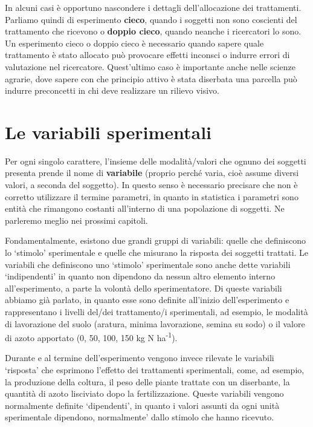 \documentclass[a4paper,12pt,oneside]{book}
\begin{document}
In alcuni casi è opportuno nascondere i dettagli dell'allocazione dei trattamenti. Parliamo quindi di esperimento \textbf{cieco}, quando i soggetti non sono coscienti del trattamento che ricevono o \textbf{doppio cieco}, quando neanche i ricercatori lo sono. Un esperimento cieco o doppio cieco è necessario quando sapere quale trattamento è stato allocato può provocare effetti inconsci o indurre errori di valutazione nel ricercatore. Quest'ultimo caso è importante anche nelle scienze agrarie, dove sapere con che principio attivo è stata diserbata una parcella può indurre preconcetti in chi deve realizzare un rilievo visivo.

\hypertarget{le-variabili-sperimentali}{%
\section{Le variabili sperimentali}\label{le-variabili-sperimentali}}

Per ogni singolo carattere, l'insieme delle modalità/valori che ognuno dei soggetti presenta prende il nome di \textbf{variabile} (proprio perché varia, cioè assume diversi valori, a seconda del soggetto). In questo senso è necessario precisare che non è corretto utilizzare il termine parametri, in quanto in statistica i parametri sono entità che rimangono costanti all'interno di una popolazione di soggetti. Ne parleremo meglio nei prossimi capitoli.

Fondamentalmente, esistono due grandi gruppi di variabili: quelle che definiscono lo `stimolo' sperimentale e quelle che misurano la risposta dei soggetti trattati. Le variabili che definiscono uno `stimolo' sperimentale sono anche dette variabili `indipendenti' in quanto non dipendono da nessun altro elemento interno all'esperimento, a parte la volontà dello sperimentatore. Di queste variabili abbiamo già parlato, in quanto esse sono definite all'inizio dell'esperimento e rappresentano i livelli del/dei trattamento/i sperimentali, ad esempio, le modalità di lavorazione del suolo (aratura, minima lavorazione, semina su sodo) o il valore di azoto apportato (0, 50, 100, 150 kg N ha\textsuperscript{-1}).

Durante e al termine dell'esperimento vengono invece rilevate le variabili `risposta' che esprimono l'effetto dei trattamenti sperimentali, come, ad esempio, la produzione della coltura, il peso delle piante trattate con un diserbante, la quantità di azoto lisciviato dopo la fertilizzazione. Queste variabili vengono normalmente definite `dipendenti', in quanto i valori assunti da ogni unità sperimentale dipendono, normalmente' dallo stimolo che hanno ricevuto.
\end{document}
